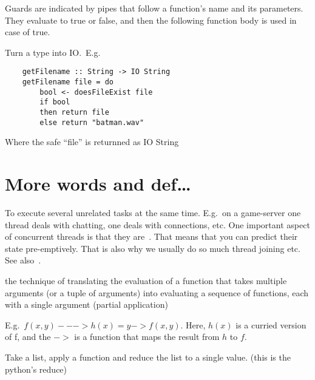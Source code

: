 \begin{definition}[Guards]
    Guards are indicated by pipes that follow a function's name and its
    parameters. They evaluate to true or false, and then the following
    function body is used in case of true.
\end{definition}

\begin{definition}[return]
    Turn a type into IO.\
    E.g.
    \begin{verbatim}
    getFilename :: String -> IO String
    getFilename file = do
        bool <- doesFileExist file
        if bool
        then return file
        else return "batman.wav" 
    \end{verbatim}

    Where the safe ``file'' is returnned as IO String
\end{definition}


\section{More words and def\dots}


\begin{definition}[Concurrency]\label{concurrency}
    To execute several unrelated tasks at the same time. E.g.\ on a game-server
    one thread deals with chatting, one deals with connections, etc.
    One important aspect of concurrent threads is that they
    are~. That means that you can predict their
    state pre-emptively. That is also why we usually do so much thread joining
    etc.
    See also~.

\end{definition}

\begin{definition}[Currying]
    the technique of translating the evaluation of a function that takes
    multiple arguments (or a tuple of arguments) into evaluating a sequence of
    functions, each with a single argument (partial application)

    E.g.\ $f(x,y) ---> h(x) = y -> f(x, y)$.
    Here, $h(x)$ is a curried version of f, and the $->$ is a function that
    maps the result from $h$ to $f$.
\end{definition}

\begin{definition}[Folding]
    Take a list, apply a function and reduce the list to a single value.
    (this is the python's reduce)

\end{definition}

